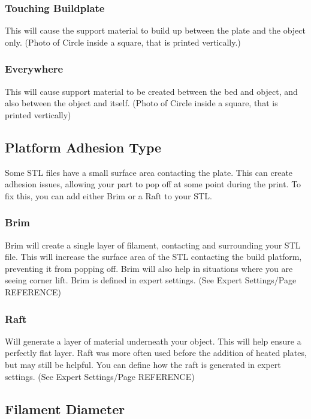 \subsubsection{Touching Buildplate}

This will cause the support material to build up between the plate and the object only. (Photo of Circle inside a square, that is printed vertically.)

\subsubsection{Everywhere}

This will cause support material to be created between the bed and object, and also between the object and itself. (Photo of Circle inside a square, that is printed vertically)

\subsection{Platform Adhesion Type}

Some STL files have a small surface area contacting the plate. This can create adhesion issues, allowing your part to pop off at some point during the print. To fix this, you can add either Brim or a Raft to your STL.

\subsubsection{Brim}

Brim will create a single layer of filament, contacting and surrounding your STL file. This will increase the surface area of the STL contacting the build platform, preventing it from popping off. Brim will also help in situations where you are seeing corner lift. Brim is defined in expert settings. (See Expert Settings/Page REFERENCE)

\subsubsection{Raft}

Will generate a layer of material underneath your object. This will help ensure a perfectly flat layer. Raft was more often used before the addition of heated plates, but may still be helpful. You can define how the raft is generated in expert settings. (See Expert Settings/Page REFERENCE)

\subsection{Filament Diameter}

